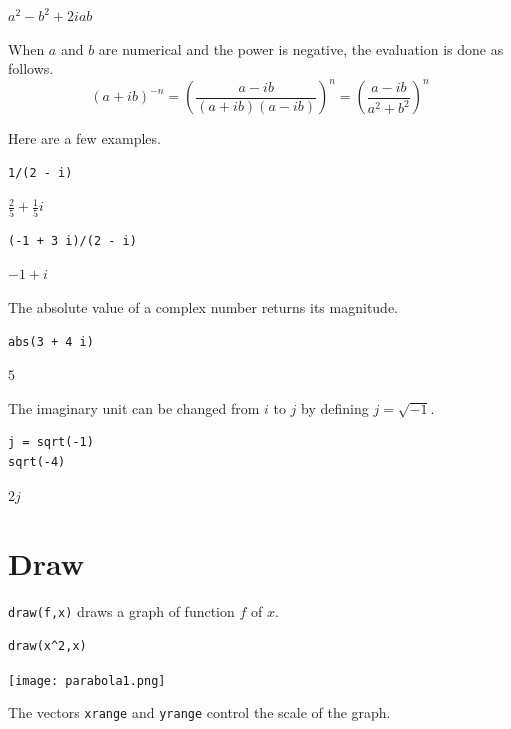 \documentclass[12pt]{article}
\begin{document}
$\displaystyle a^2-b^2+2iab$

\bigskip

When $a$ and $b$ are numerical and the power is negative, the evaluation is done as follows.
\begin{equation*}
(a+ib)^{-n}
=\left(\frac{a-ib}{(a+ib)(a-ib)}\right)^n=
\left(\frac{a-ib}{a^2+b^2}\right)^n
\end{equation*}

Here are a few examples.

{\color{blue}
\begin{verbatim}
1/(2 - i)
\end{verbatim}
}

$\displaystyle \tfrac{2}{5}+\tfrac{1}{5}i$

{\color{blue}
\begin{verbatim}
(-1 + 3 i)/(2 - i)
\end{verbatim}
}

$\displaystyle -1+i$

\bigskip

The absolute value of a complex number returns its magnitude.

{\color{blue}
\begin{verbatim}
abs(3 + 4 i)
\end{verbatim}
}

$\displaystyle 5$

\bigskip

The imaginary unit can be changed from $i$ to $j$
by defining $j=\sqrt{-1}$.

{\color{blue}
\begin{verbatim}
j = sqrt(-1)
sqrt(-4)
\end{verbatim}
}

$\displaystyle 2j$

\newpage

\section{Draw}

\verb$draw(f,x)$ draws a graph of function $f$ of $x$.

{\color{blue}
\begin{verbatim}
draw(x^2,x)
\end{verbatim}}

\begin{center}
\texttt{[image: parabola1.png]}
\end{center}

The vectors \verb$xrange$ and \verb$yrange$ control the scale of the graph.
\end{document}
